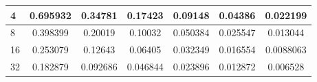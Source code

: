 \documentclass[fleqn,10pt]{olplainarticle}
\begin{document}
\begin{table}[!ht]
\begin{tabular}{l|cccccc|}
    \multicolumn{1}{|l|}{4}                                                                            & \multicolumn{1}{c|}{0.695932}                                                            & \multicolumn{1}{c|}{0.34781}                                                             & \multicolumn{1}{c|}{0.17423}                                                             & \multicolumn{1}{c|}{0.09148}                                                              & \multicolumn{1}{c|}{0.04386}                                                              & 0.022199                                                             \\ \hline
    \multicolumn{1}{|l|}{8}                                                                            & \multicolumn{1}{c|}{0.398399}                                                            & \multicolumn{1}{c|}{0.20019}                                                             & \multicolumn{1}{c|}{0.10032}                                                             & \multicolumn{1}{c|}{0.050384}                                                             & \multicolumn{1}{c|}{0.025547}                                                             & 0.013044                                                             \\ \hline
    \multicolumn{1}{|l|}{16}                                                                           & \multicolumn{1}{c|}{0.253079}                                                            & \multicolumn{1}{c|}{0.12643}                                                             & \multicolumn{1}{c|}{0.06405}                                                             & \multicolumn{1}{c|}{0.032349}                                                             & \multicolumn{1}{c|}{0.016554}                                                             & 0.0088063                                                            \\ \hline
    \multicolumn{1}{|l|}{32}                                                                           & \multicolumn{1}{c|}{0.182879}                                                            & \multicolumn{1}{c|}{0.092686}                                                            & \multicolumn{1}{c|}{0.046844}                                                            & \multicolumn{1}{c|}{0.023896}                                                             & \multicolumn{1}{c|}{0.012872}                                                             & 0.006528                                                             \\ \hline

\end{tabular}
\end{table}
\end{document}
